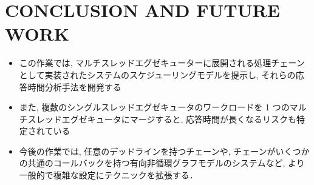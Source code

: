 
\section{CONCLUSION AND FUTURE WORK}
\label{sec: conclusion and future work}

\begin{frame}{}
    \begin{itemize}
        \item この作業では, マルチスレッドエグゼキューターに展開される処理チェーンとして実装されたシステムのスケジューリングモデルを提示し, それらの応答時間分析手法を開発する
\item また, 複数のシングルスレッドエグゼキュータのワークロードを 1 つのマルチスレッドエグゼキュータにマージすると, 応答時間が長くなるリスクも特定されている
\item 今後の作業では, 任意のデッドラインを持つチェーンや, チェーンがいくつかの共通のコールバックを持つ有向非循環グラフモデルのシステムなど, より一般的で複雑な設定にテクニックを拡張する．
    \end{itemize}
\end{frame}
